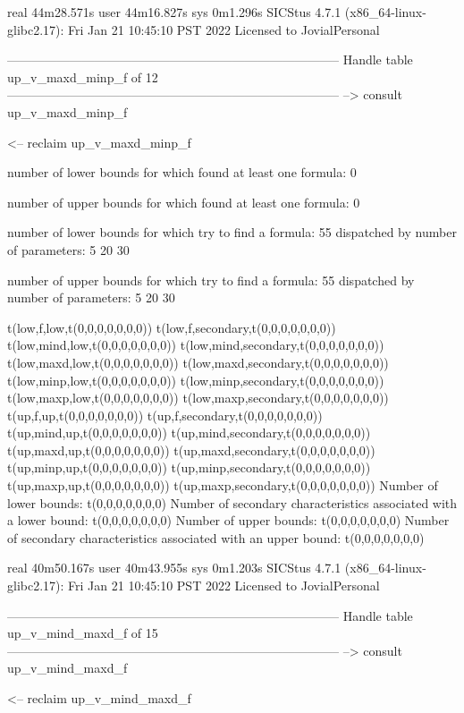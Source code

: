 real	44m28.571s
user	44m16.827s
sys	0m1.296s
SICStus 4.7.1 (x86_64-linux-glibc2.17): Fri Jan 21 10:45:10 PST 2022
Licensed to JovialPersonal


--------------------------------------------------------------------------------
Handle table up_v_maxd_minp_f of 12
--------------------------------------------------------------------------------
--> consult up_v_maxd_minp_f

<-- reclaim up_v_maxd_minp_f

number of lower bounds for which found at least one formula: 0

number of upper bounds for which found at least one formula: 0

number of lower bounds for which try to find a formula: 55
dispatched by number of parameters: 5  20  30

number of upper bounds for which try to find a formula: 55
dispatched by number of parameters: 5  20  30

t(low,f,low,t(0,0,0,0,0,0,0))
t(low,f,secondary,t(0,0,0,0,0,0,0))
t(low,mind,low,t(0,0,0,0,0,0,0))
t(low,mind,secondary,t(0,0,0,0,0,0,0))
t(low,maxd,low,t(0,0,0,0,0,0,0))
t(low,maxd,secondary,t(0,0,0,0,0,0,0))
t(low,minp,low,t(0,0,0,0,0,0,0))
t(low,minp,secondary,t(0,0,0,0,0,0,0))
t(low,maxp,low,t(0,0,0,0,0,0,0))
t(low,maxp,secondary,t(0,0,0,0,0,0,0))
t(up,f,up,t(0,0,0,0,0,0,0))
t(up,f,secondary,t(0,0,0,0,0,0,0))
t(up,mind,up,t(0,0,0,0,0,0,0))
t(up,mind,secondary,t(0,0,0,0,0,0,0))
t(up,maxd,up,t(0,0,0,0,0,0,0))
t(up,maxd,secondary,t(0,0,0,0,0,0,0))
t(up,minp,up,t(0,0,0,0,0,0,0))
t(up,minp,secondary,t(0,0,0,0,0,0,0))
t(up,maxp,up,t(0,0,0,0,0,0,0))
t(up,maxp,secondary,t(0,0,0,0,0,0,0))
Number of lower bounds:                                             t(0,0,0,0,0,0,0)
Number of secondary characteristics associated with a lower bound:  t(0,0,0,0,0,0,0)
Number of upper bounds:                                             t(0,0,0,0,0,0,0)
Number of secondary characteristics associated with an upper bound: t(0,0,0,0,0,0,0)

real	40m50.167s
user	40m43.955s
sys	0m1.203s
SICStus 4.7.1 (x86_64-linux-glibc2.17): Fri Jan 21 10:45:10 PST 2022
Licensed to JovialPersonal


--------------------------------------------------------------------------------
Handle table up_v_mind_maxd_f of 15
--------------------------------------------------------------------------------
--> consult up_v_mind_maxd_f

<-- reclaim up_v_mind_maxd_f

